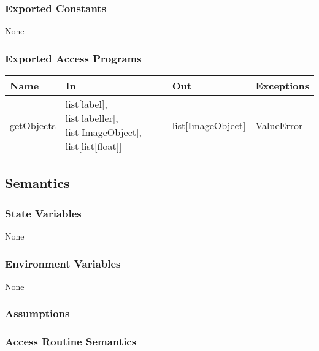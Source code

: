 \documentclass[12pt, titlepage]{article}
\begin{document}
  
  \subsubsection{Exported Constants}
  None
  \subsubsection{Exported Access Programs}
  
  \begin{center}
  \begin{tabular}{p{2cm} p{4cm} p{4cm} p{2cm}}
  \hline
  \textbf{Name} & \textbf{In} & \textbf{Out} & \textbf{Exceptions} \\
  \hline
  getObjects & list[label], list[labeller], list[ImageObject], list[list[float]]& list[ImageObject]  & ValueError \\
  
  \end{tabular}
  \end{center}
  
  \subsection{Semantics}
  
  \subsubsection{State Variables}
  
 None
  
  \subsubsection{Environment Variables}
  
  None
  
  \subsubsection{Assumptions}
  
  
  \subsubsection{Access Routine Semantics}
  
\end{document}
